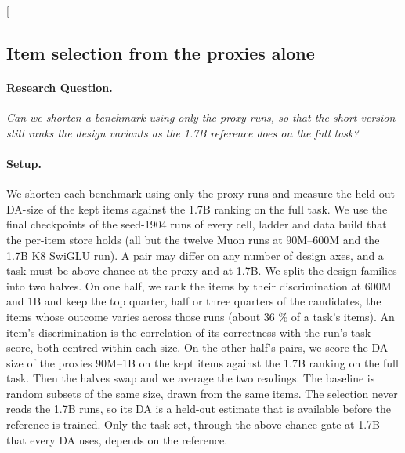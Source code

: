 \clearpage
\twocolumn[{%
\rqparent
\subsection{Item selection from the proxies alone}
\label{app:rq14_proxy_item_selection}

\noindent\begin{minipage}[t]{0.485\textwidth}
\vspace{0pt}
\paragraph{Research Question.} \emph{Can we shorten a benchmark using only the proxy runs, so that the short version still ranks the design variants as the 1.7B reference does on the full task?}

\paragraph{Setup.} We shorten each benchmark using only the proxy runs and measure the held-out DA-size of the kept items against the 1.7B ranking on the full task. We use the final checkpoints of the seed-1904 runs of every cell, ladder and data build that the per-item store holds (all but the twelve Muon runs at 90M--600M and the 1.7B K8 SwiGLU run). A pair may differ on any number of design axes, and a task must be above chance at the proxy and at 1.7B. We split the design families into two halves. On one half, we rank the items by their discrimination at 600M and 1B and keep the top quarter, half or three quarters of the candidates, the items whose outcome varies across those runs (about 36 \% of a task's items). An item's discrimination is the correlation of its correctness with the run's task score, both centred within each size. On the other half's pairs, we score the DA-size of the proxies 90M--1B on the kept items against the 1.7B ranking on the full task. Then the halves swap and we average the two readings. The baseline is random subsets of the same size, drawn from the same items. The selection never reads the 1.7B runs, so its DA is a held-out estimate that is available before the reference is trained. Only the task set, through the above-chance gate at 1.7B that every DA uses, depends on the reference.
\end{minipage}\hfill
\begin{minipage}[t]{0.485\textwidth}
\vspace{0pt}
\begin{rqfinding}

\end{rqfinding}
\end{minipage}}
